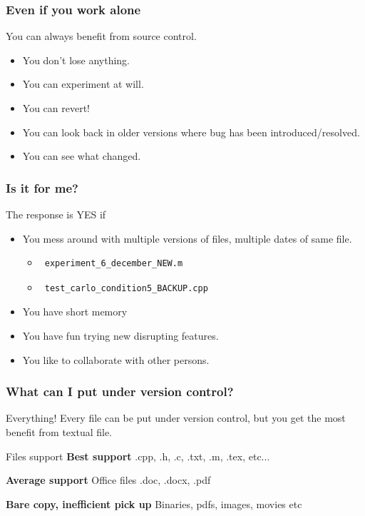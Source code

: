 \documentclass[10pt]{beamer}
\begin{document}
\begin{frame}
\frametitle{Even if you work alone}
You can always benefit from source control.
\begin{itemize}
 \item You don't lose anything.
 \item You can experiment at will.
\item You can revert!
\item You can look back in older versions where bug has been introduced/resolved.
\item You can see what changed.
\end{itemize}
\end{frame}



\begin{frame}[fragile]
\frametitle{Is it for me?}
The response is YES if
\begin{itemize}
\item You mess around with multiple versions of files, multiple dates of same file.
\begin{itemize}
 \item  \begin{verbatim} experiment_6_december_NEW.m \end{verbatim}
 \item  \begin{verbatim} test_carlo_condition5_BACKUP.cpp \end{verbatim}
\end{itemize}

\item You have short memory
\item You have fun trying new disrupting features.
\item You like to collaborate with other persons.
\end{itemize}
\end{frame}


\begin{frame}
\frametitle{What can I put under version control?}
Everything! Every file can be put under version control, but you get the most benefit from textual file.
\begin{block}{Files support}
\textbf{Best support} .cpp, .h, .c, .txt, .m, .tex, etc...

\textbf{Average support} Office files .doc, .docx, .pdf

\textbf{Bare copy, inefficient pick up} Binaries, pdfs, images, movies etc
\end{block}
\end{frame}
\end{document}
